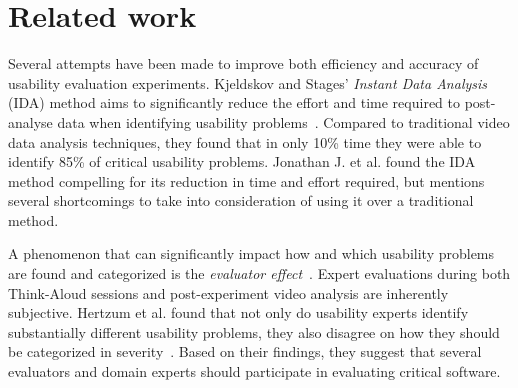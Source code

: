 
\section{Related work}
Several attempts have been made to improve both efficiency and accuracy of
usability evaluation experiments. Kjeldskov and Stages' \textit{Instant Data
Analysis} (IDA) method aims to significantly reduce the effort and time required
to post-analyse data when identifying usability
problems~\cite{instant_data_analysis}. Compared to traditional video data
analysis techniques, they found that in only 10\% time they were able to
identify 85\% of critical usability problems. Jonathan J. et al. found the IDA
method compelling for its reduction in time and effort required, but mentions
several shortcomings to take into consideration of using it over a traditional
method.


A phenomenon that can significantly impact how and which usability problems are
found and categorized is the \textit{evaluator effect}~\cite{eval_effect}.
Expert evaluations during both Think-Aloud sessions and post-experiment video
analysis are inherently subjective.  Hertzum et al. found that not only do
usability experts identify substantially different usability problems, they also
disagree on how they should be categorized in
severity~\cite{eval_effect_research}. Based on their findings, they suggest that
several evaluators and domain experts should participate in evaluating critical
software.



